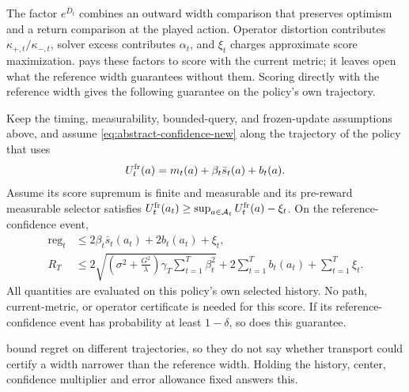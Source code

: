 The factor $e^{\bar D_t}$ combines an outward width comparison that preserves
optimism and a return comparison at the played action. Operator distortion
contributes $\kappa_{+,t}/\kappa_{-,t}$, solver excess contributes $\alpha_t$,
and $\xi_t$ charges approximate score maximization. 
pays these factors to score with the current metric; it leaves open what the
reference width guarantees without them. Scoring directly with the reference
width gives the following guarantee on the policy's own trajectory.

\begin{proposition}
\label{prop:frozen-width-ucb}
Keep the timing, measurability, bounded-query, and frozen-update assumptions
above, and assume \eqref{eq:abstract-confidence-new} along the trajectory of
the policy that uses
\[
 U_t^{\rm fr}(a)=m_t(a)+\beta_t\bar s_t(a)+b_t(a).
\]
Assume its score supremum is finite and measurable and its pre-reward
measurable selector satisfies
$U_t^{\rm fr}(a_t)\ge\sup_{a\in\mathcal{A}_t}U_t^{\rm fr}(a)-\xi_t$.
On the reference-confidence event,
\begin{align}
 \operatorname{reg}_t
 &\le 2\beta_t\bar s_t(a_t)+2b_t(a_t)+\xi_t,\nonumber\\
 R_T
 &\le 2\sqrt{\left(\sigma^2+\frac{G^2}{\lambda}\right)
 \gamma_T\sum_{t=1}^T\beta_t^2}
 +2\sum_{t=1}^Tb_t(a_t)+\sum_{t=1}^T\xi_t.
 \label{eq:frozen-width-regret}
\end{align}
All quantities are evaluated on this policy's own selected history.  No path,
current-metric, or operator certificate is needed for this score.  If its
reference-confidence event has probability at least $1-\delta$, so does this
guarantee.
\end{proposition}

 bound regret on different
trajectories, so they do not say whether transport could certify a width
narrower than the reference width. Holding the history, center, confidence
multiplier and error allowance fixed answers this.

